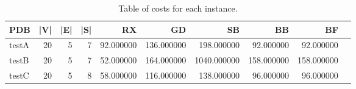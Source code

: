 \begin{table}
\caption{Table of costs for each instance.}
\label{tab:costs}
\begin{tabular}{lrrrrrrrrr}
\toprule
PDB & |V| & |E| & |S| & RX & GD & SB & BB & BF \\
\midrule
testA & 20 & 5 & 7 & 92.000000 & 136.000000 & 198.000000 & 92.000000 & 92.000000 \\
testB & 20 & 5 & 7 & 52.000000 & 164.000000 & 1040.000000 & 158.000000 & 158.000000 \\
testC & 20 & 5 & 8 & 58.000000 & 116.000000 & 138.000000 & 96.000000 & 96.000000 \\
\bottomrule
\end{tabular}
\end{table}
